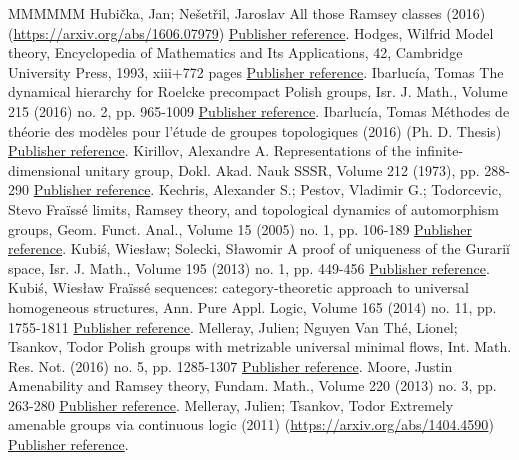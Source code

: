 \documentclass[11pt]{article}
\theoremstyle{definition}
\numberwithin{equation}{section}
\numberwithin{figure}{section}
\numberwithin{table}{section}
\begin{document}
\begin{thebibliography}{MMMMMM}
 Hubička, Jan; Nešetřil, Jaroslav All those Ramsey classes (2016) (\url{https://arxiv.org/abs/1606.07979}) \href{https://ahl.centre-mersenne.org/item/AHL_2019__2__149_0/#HN}{Publisher reference}.
 Hodges, Wilfrid Model theory, Encyclopedia of Mathematics and Its Applications, 42, Cambridge University Press, 1993, xiii+772 pages \href{https://ahl.centre-mersenne.org/item/AHL_2019__2__149_0/#H}{Publisher reference}.
 Ibarlucía, Tomas The dynamical hierarchy for Roelcke precompact Polish groups, Isr. J. Math., Volume 215 (2016) no. 2, pp. 965-1009 \href{https://ahl.centre-mersenne.org/item/AHL_2019__2__149_0/#I1}{Publisher reference}.
 Ibarlucía, Tomas Méthodes de théorie des modèles pour l’étude de groupes topologiques (2016) (Ph. D. Thesis) \href{https://ahl.centre-mersenne.org/item/AHL_2019__2__149_0/#I0}{Publisher reference}.
 Kirillov, Alexandre A. Representations of the infinite-dimensional unitary group, Dokl. Akad. Nauk SSSR, Volume 212 (1973), pp. 288-290 \href{https://ahl.centre-mersenne.org/item/AHL_2019__2__149_0/#Ki}{Publisher reference}.
 Kechris, Alexander S.; Pestov, Vladimir G.; Todorcevic, Stevo Fraïssé limits, Ramsey theory, and topological dynamics of automorphism groups, Geom. Funct. Anal., Volume 15 (2005) no. 1, pp. 106-189 \href{https://ahl.centre-mersenne.org/item/AHL_2019__2__149_0/#KPT}{Publisher reference}.
 Kubiś, Wiesław; Solecki, Sławomir A proof of uniqueness of the Gurariĭ space, Isr. J. Math., Volume 195 (2013) no. 1, pp. 449-456 \href{https://ahl.centre-mersenne.org/item/AHL_2019__2__149_0/#KuS}{Publisher reference}.
 Kubiś, Wiesław Fraïssé sequences: category-theoretic approach to universal homogeneous structures, Ann. Pure Appl. Logic, Volume 165 (2014) no. 11, pp. 1755-1811 \href{https://ahl.centre-mersenne.org/item/AHL_2019__2__149_0/#Ku}{Publisher reference}.
 Melleray, Julien; Nguyen Van Thé, Lionel; Tsankov, Todor Polish groups with metrizable universal minimal flows, Int. Math. Res. Not. (2016) no. 5, pp. 1285-1307 \href{https://ahl.centre-mersenne.org/item/AHL_2019__2__149_0/#MNT}{Publisher reference}.
 Moore, Justin Amenability and Ramsey theory, Fundam. Math., Volume 220 (2013) no. 3, pp. 263-280 \href{https://ahl.centre-mersenne.org/item/AHL_2019__2__149_0/#M}{Publisher reference}.
 Melleray, Julien; Tsankov, Todor Extremely amenable groups via continuous logic (2011) (\url{https://arxiv.org/abs/1404.4590}) \href{https://ahl.centre-mersenne.org/item/AHL_2019__2__149_0/#MT}{Publisher reference}.

\end{thebibliography}
\end{document}
